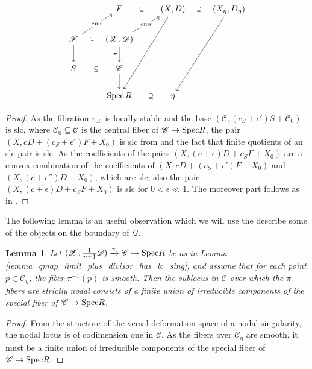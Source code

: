 \documentclass[a4paper,12pt]{amsart}
\newcommand{\cQ}{\mathcal{Q}}
\DeclareMathOperator{\Spec}{Spec}
\newcommand{\sD}{{\mathscr{D}}}
\newcommand{\sX}{{\mathscr{X}}}
\newcommand{\sC}{{\mathscr{C}}}
\newcommand\spec{\text{\rm Spec}}
\newtheorem{lemma}[theorem]{Lemma}
\theoremstyle{definition}
\theoremstyle{remark}
\begin{document}
\[\begin{tikzcd}
	& F & {(X,D)} & {(X_{\eta},D_{\eta})} \\
	{\mathscr{F}} & {(\mathscr{X},\mathscr{D})} \\
	{S} & {\mathscr{C}} \\
	& {\Spec R} & \eta
	\arrow["\subseteq"{description}, draw=none, from=1-2, to=1-3]
	\arrow[from=1-3, to=4-2]
	\arrow["\supseteq"{description}, draw=none, from=1-4, to=1-3]
	\arrow[from=1-4, to=4-3]
	\arrow["{\textup{cms}}"{description}, from=2-1, to=1-2]
	\arrow["\subseteq"{description}, draw=none, from=2-1, to=2-2]
	\arrow[from=2-1, to=3-1]
	\arrow["{\textup{cms}}"{description}, from=2-2, to=1-3]
	\arrow["\pi"', from=2-2, to=3-2]
	\arrow["\subseteq"{description}, draw=none, from=3-2, to=3-1]
	\arrow[from=3-2, to=4-2]
	\arrow["\supseteq"{description}, draw=none, from=4-3, to=4-2]
\end{tikzcd}\]
\begin{proof}
    As the fibration $\pi_\sX$ is locally stable and the base $(\sC,(c_S +\epsilon')S + \sC_0)$ is slc, where $\sC_0\subseteq \sC$ is the central fiber of $\sC\to \spec R $, the pair $(X,cD + (c_S +\epsilon')F+X_0)$ is slc from \cite[Lemma 2.12]{patakfalvi2016fibered} and the fact that finite quotients of an slc pair is slc. As the coefficients of the pairs $(X,(c+\epsilon){D} + c_S F + X_0)$ are a convex combination of the coefficients of $(X,cD + (c_S +\epsilon')F+X_0)$ and $(X,(c+\epsilon''){D} + X_0)$, which are slc, also the pair $(X,(c+\epsilon)D + c_SF + X_0)$ is slc for $0<\epsilon \ll 1$. The moreover part follows as in .
\end{proof}

The following lemma is an useful observation which we will use the describe some of the objects on the boundary of $\cQ$.
    
\begin{lemma}\label{lemma_nodal_locus_for_qmap_limit_is_union_of_irred_cp_of_special_fiber}
    Let $(\sX,\frac{1}{n+1}\sD)\xrightarrow{\pi} \sC\to \spec R $ be as in Lemma \ref{lemma_qmap_limit_plus_divisor_has_lc_sing}, and assume that for each point $p\in \sC_\eta$, the fiber $\pi^{-1}(p)$ is smooth. Then the sublocus in $\sC$ over which the $\pi$-fibers are strictly nodal consists of a finite union of irreducible components of the special fiber of $\sC\to \spec R $.
\end{lemma}
\begin{proof}
    From the structure of the versal deformation space of a nodal singularity, the nodal locus is of codimension one in $\sC$. As the fibers over $\sC_\eta$ are smooth, it must be a finite union of irreducible components of the special fiber of $\sC\to \spec R $.
\end{proof}
   
\end{document}
